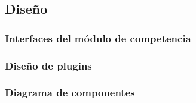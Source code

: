 
\clearpage
\subsection{Diseño}

\subsubsection{Interfaces del módulo de competencia}

    
    
    
    
    
    
    
    


\subsubsection{Diseño de plugins} %
\subsubsection{Diagrama de componentes} %

